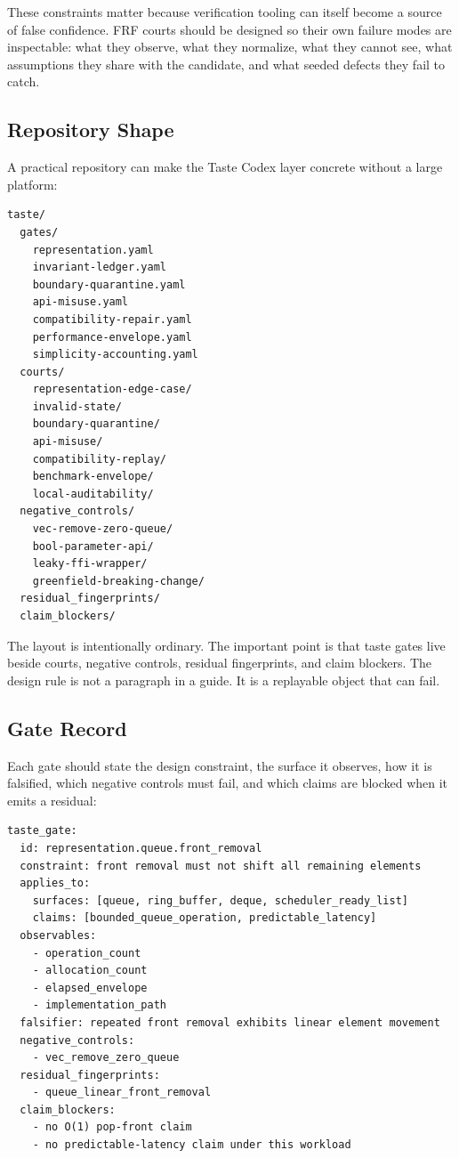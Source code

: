 \documentclass[11pt,a4paper]{article}
\newcommand{\frf}{\textsc{FRF}}
\begin{document}
These constraints matter because verification tooling can itself become a source of false confidence. \frf{} courts should be designed so their own failure modes are inspectable: what they observe, what they normalize, what they cannot see, what assumptions they share with the candidate, and what seeded defects they fail to catch.

\subsection{Repository Shape}

A practical repository can make the Taste Codex layer concrete without a large platform:
\begin{verbatim}
taste/
  gates/
    representation.yaml
    invariant-ledger.yaml
    boundary-quarantine.yaml
    api-misuse.yaml
    compatibility-repair.yaml
    performance-envelope.yaml
    simplicity-accounting.yaml
  courts/
    representation-edge-case/
    invalid-state/
    boundary-quarantine/
    api-misuse/
    compatibility-replay/
    benchmark-envelope/
    local-auditability/
  negative_controls/
    vec-remove-zero-queue/
    bool-parameter-api/
    leaky-ffi-wrapper/
    greenfield-breaking-change/
  residual_fingerprints/
  claim_blockers/
\end{verbatim}

The layout is intentionally ordinary. The important point is that taste gates live beside courts, negative controls, residual fingerprints, and claim blockers. The design rule is not a paragraph in a guide. It is a replayable object that can fail.

\subsection{Gate Record}

Each gate should state the design constraint, the surface it observes, how it is falsified, which negative controls must fail, and which claims are blocked when it emits a residual:
\begin{verbatim}
taste_gate:
  id: representation.queue.front_removal
  constraint: front removal must not shift all remaining elements
  applies_to:
    surfaces: [queue, ring_buffer, deque, scheduler_ready_list]
    claims: [bounded_queue_operation, predictable_latency]
  observables:
    - operation_count
    - allocation_count
    - elapsed_envelope
    - implementation_path
  falsifier: repeated front removal exhibits linear element movement
  negative_controls:
    - vec_remove_zero_queue
  residual_fingerprints:
    - queue_linear_front_removal
  claim_blockers:
    - no O(1) pop-front claim
    - no predictable-latency claim under this workload
\end{verbatim}
\end{document}
